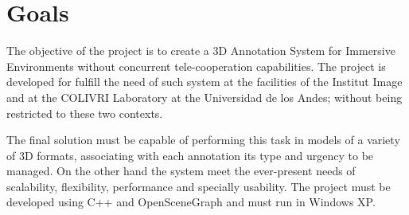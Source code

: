 \section{Goals}
The objective of the project is to create a 3D Annotation System for Immersive Environments without concurrent tele-cooperation capabilities. The project is developed for fulfill the need of such system at the facilities of the Institut Image and at the COLIVRI Laboratory at the Universidad de los Andes; without being restricted to these two contexts.

The final solution must be capable of performing this task in models of a variety of 3D formats, associating with each annotation its type and urgency to be managed. On the other hand the system meet the ever-present needs of scalability, flexibility, performance and specially usability. The project must be developed using C++ and OpenSceneGraph and must run in Windows XP.